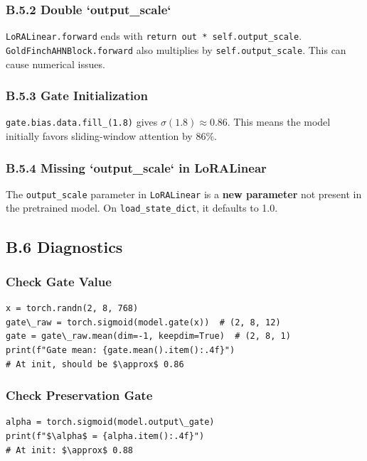 \subsubsection{B.5.2 Double `output\_scale`}

\texttt{LoRALinear.forward} ends with \texttt{return out * self.output\_scale}. 
\texttt{GoldFinchAHNBlock.forward} also multiplies by \texttt{self.output\_scale}. This 
can cause numerical issues.

\subsubsection{B.5.3 Gate Initialization}

\texttt{gate.bias.data.fill\_(1.8)} gives $\sigma(1.8) \approx 0.86$. This means 
the model initially favors sliding-window attention by 86\%.

\subsubsection{B.5.4 Missing `output\_scale` in LoRALinear}

The \texttt{output\_scale} parameter in \texttt{LoRALinear} is a \textbf{new parameter} not 
present in the pretrained model. On \texttt{load\_state\_dict}, it defaults to 1.0.

\subsection{B.6 Diagnostics}

\subsubsection{Check Gate Value}

\begin{lstlisting}
x = torch.randn(2, 8, 768)
gate\_raw = torch.sigmoid(model.gate(x))  # (2, 8, 12)
gate = gate\_raw.mean(dim=-1, keepdim=True)  # (2, 8, 1)
print(f"Gate mean: {gate.mean().item():.4f}")
# At init, should be $\approx$ 0.86
\end{lstlisting}

\subsubsection{Check Preservation Gate}

\begin{lstlisting}
alpha = torch.sigmoid(model.output\_gate)
print(f"$\alpha$ = {alpha.item():.4f}")
# At init: $\approx$ 0.88
\end{lstlisting}

